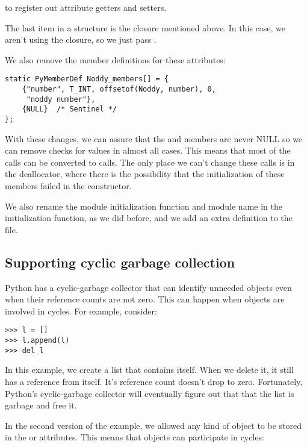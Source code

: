 to register out attribute getters and setters.  

The last item in a  structure is the closure
mentioned above. In this case, we aren't using the closure, so we just
pass \NULL.

We also remove the member definitions for these attributes:

\begin{verbatim}
static PyMemberDef Noddy_members[] = {
    {"number", T_INT, offsetof(Noddy, number), 0,
     "noddy number"},
    {NULL}  /* Sentinel */
};
\end{verbatim}

With these changes, we can assure that the  and
 members are never NULL so we can remove checks for \NULL
values in almost all cases. This means that most of the
 calls can be converted to 
calls. The only place we can't change these calls is in the
deallocator, where there is the possibility that the initialization of
these members failed in the constructor.

We also rename the module initialization function and module name in
the initialization function, as we did before, and we add an extra
definition to the  file.

\subsection{Supporting cyclic garbage collection}

Python has a cyclic-garbage collector that can identify unneeded
objects even when their reference counts are not zero. This can happen
when objects are involved in cycles.  For example, consider:

\begin{verbatim}
>>> l = []
>>> l.append(l)
>>> del l
\end{verbatim}

In this example, we create a list that contains itself. When we delete
it, it still has a reference from itself. It's reference count doesn't
drop to zero.  Fortunately, Python's cyclic-garbage collector will
eventually figure out that that the list is garbage and free it.

In the second version of the  example, we allowed any
kind of object to be stored in the  or 
attributes. This means that  objects can participate in
cycles:

